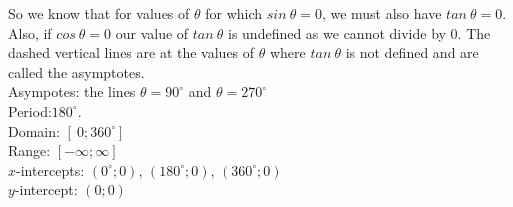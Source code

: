 \begin{wex}
{So we know that for values of $\theta $ for which $sin~\theta =0$, we must also have $tan~\theta =0$. Also, if $cos~\theta =0$ our value of $tan~\theta $ is undefined as we cannot divide by $0$. The dashed vertical lines are at the values of $\theta $ where $tan~\theta $ is not defined and are called the asymptotes.
\vspace{8pt}\\

Asympotes: the lines $\theta = 90^{\circ}$ and $\theta = 270^{\circ}$ \\
Period:$180^{\circ}$. \\
Domain: $[~0; 360^{\circ}]$\\
Range: $[-\infty;\infty]$\\
$x$-intercepts: $(0^{\circ}; 0)$, $(180^{\circ}; 0)$, $(360^{\circ}; 0)$\\
$y$-intercept: $(0;0)$\\

}
\end{wex}




% 

